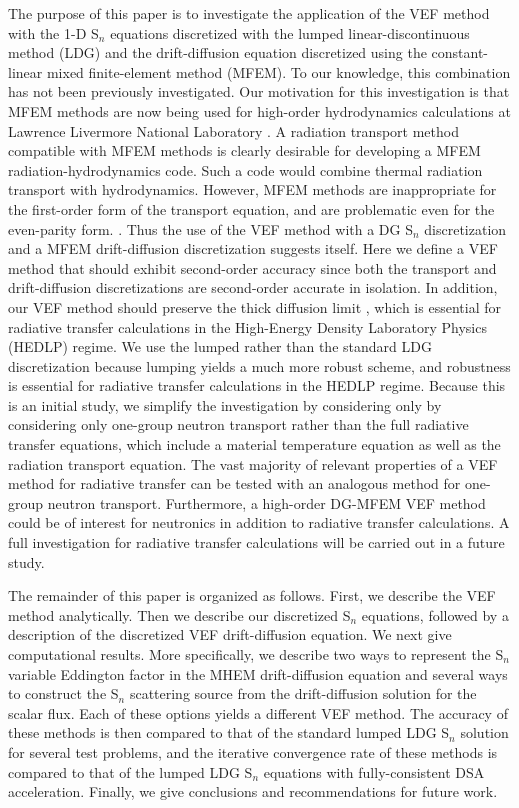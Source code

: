The purpose of this paper is to investigate the application of the VEF method with the 1-D S$_n$ equations 
discretized with the lumped linear-discontinuous method (LDG) and the drift-diffusion equation discretized using the 
constant-linear mixed finite-element method (MFEM).  To our knowledge, this combination has not been previously 
investigated.  Our motivation for this investigation is that MFEM methods are now being used for high-order hydrodynamics 
calculations at Lawrence Livermore National Laboratory \cite{*}.  A radiation transport method compatible with MFEM 
methods is clearly desirable for developing a MFEM radiation-hydrodynamics code.  Such a code would combine thermal 
radiation transport with hydrodynamics.  However, MFEM methods are inappropriate for the first-order form of the 
transport equation, and are problematic even for the even-parity form. \cite{*}.  
Thus the use of the VEF method with a DG S$_n$ discretization and a MFEM drift-diffusion discretization suggests itself.
Here we define a VEF method that should exhibit second-order accuracy since both the transport and drift-diffusion 
discretizations are second-order accurate in isolation.  In addition, our VEF method should preserve the thick diffusion 
limit \cite{*}, which is essential for radiative transfer calculations in the High-Energy Density Laboratory Physics 
(HEDLP) regime. We use the lumped 
rather than the standard LDG discretization because lumping yields a much more robust scheme, and robustness is essential 
for radiative transfer calculations in the HEDLP regime.   Because this is an initial study, we simplify the investigation by considering only 
by considering only one-group neutron transport rather than the full radiative transfer equations, which include a 
material temperature equation as well as the radiation transport equation.  The vast majority of relevant properties of  
a VEF method for radiative transfer can be tested with an analogous method for one-group neutron transport.  Furthermore, 
a high-order DG-MFEM VEF method could be of interest for neutronics in addition to radiative transfer calculations. 
A full investigation for radiative transfer calculations will be carried out in a future study. 

The remainder of this paper is organized as follows.  First, we describe the VEF method analytically. Then we describe 
our discretized S$_n$ equations, followed by a description of the discretized VEF drift-diffusion equation.  We next give 
computational results.  More specifically, we describe 
two ways to represent the S$_n$ variable Eddington factor in the MHEM drift-diffusion equation and several ways to 
construct the S$_n$ scattering source from the drift-diffusion solution for the scalar flux. Each of these options 
yields a different VEF method.  The accuracy of these methods is then compared to that of the standard lumped LDG 
S$_n$ solution for several test problems, and the iterative convergence rate of these methods is compared to that of the 
lumped LDG S$_n$ equations with fully-consistent DSA acceleration. Finally, we give conclusions and 
recommendations for future work.